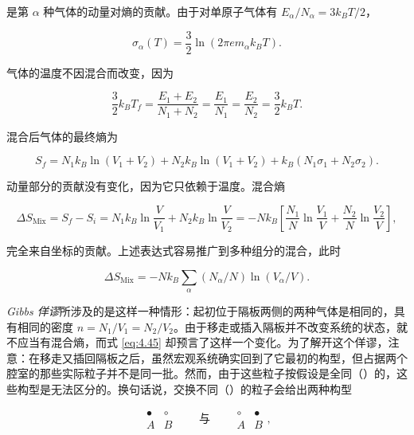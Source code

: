 是第 $\alpha$ 种气体的动量对熵的贡献。由于对单原子气体有 $E_\alpha/N_\alpha=3k_BT/2$，

\begin{equation}\label{eq:4.42}
  \sigma_\alpha(T)=\frac{3}{2}\ln(2\pi em_\alpha k_BT).
\end{equation}

气体的温度不因混合而改变，因为

\begin{equation}\label{eq:4.43}
  \frac{3}{2}k_BT_f=\frac{E_1+E_2}{N_1+N_2}=\frac{E_1}{N_1}=\frac{E_2}{N_2}=\frac{3}{2}k_BT.
\end{equation}

混合后气体的最终熵为

\begin{equation}\label{eq:4.44}
  S_f=N_1k_B\ln(V_1+V_2)+N_2k_B\ln(V_1+V_2)+k_B(N_1\sigma_1+N_2\sigma_2).
\end{equation}

动量部分的贡献没有变化，因为它只依赖于温度。混合熵

\begin{equation}\label{eq:4.45}
  \Delta S_{\text{Mix}}=S_f-S_i=N_1k_B\ln\frac{V}{V_1}+N_2k_B\ln\frac{V}{V_2}=-Nk_B\left[\frac{N_1}{N}\ln\frac{V_1}{V}+\frac{N_2}{N}\ln\frac{V_2}{V}\right],
\end{equation}

完全来自坐标的贡献。上述表达式容易推广到多种组分的混合，此时

\begin{equation*}
  \Delta S_{\text{Mix}}=-Nk_B\sum_\alpha(N_\alpha/N)\ln(V_\alpha/V).
\end{equation*}


\emph{Gibbs 佯谬}所涉及的是这样一种情形：起初位于隔板两侧的两种气体是相同的，具有相同的密度 $n=N_1/V_1=N_2/V_2$。由于移走或插入隔板并不改变系统的状态，就不应当有混合熵，而式 \eqref{eq:4.45} 却预言了这样一个变化。为了解开这个佯谬，注意：在移走又插回隔板之后，虽然宏观系统确实回到了它最初的构型，但占据两个腔室的那些实际粒子并不是同一批。然而，由于这些粒子按假设是全同（）的，这些构型是无法区分的。换句话说，交换不同（）的粒子会给出两种构型

\begin{equation*}
  \begin{array}{c|c}
    \bullet & \circ\\ \hline
    A & B
  \end{array}
  \qquad\text{与}\qquad
  \begin{array}{c|c}
    \circ & \bullet\\ \hline
    A & B
  \end{array},
\end{equation*}

